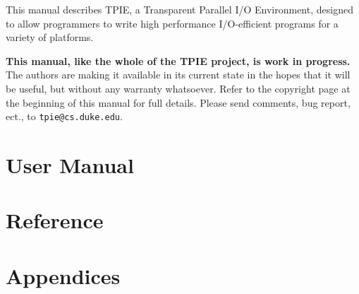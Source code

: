 This manual describes TPIE, a Transparent Parallel I/O Environment,
designed to allow programmers to write high performance I/O-efficient
programs for a variety of platforms.

{\bf This manual, like the whole of the TPIE project, is work in
  progress.} The authors are making it available in its current state
  in the hopes that it will be useful, but without any warranty
  whatsoever. Refer to the copyright page at the beginning of this
  manual for full details. Please send comments, bug report, ect., to
  \verb|tpie@cs.duke.edu|.

\part{User Manual}
  

\part{Reference}




\part{Appendices}
   




